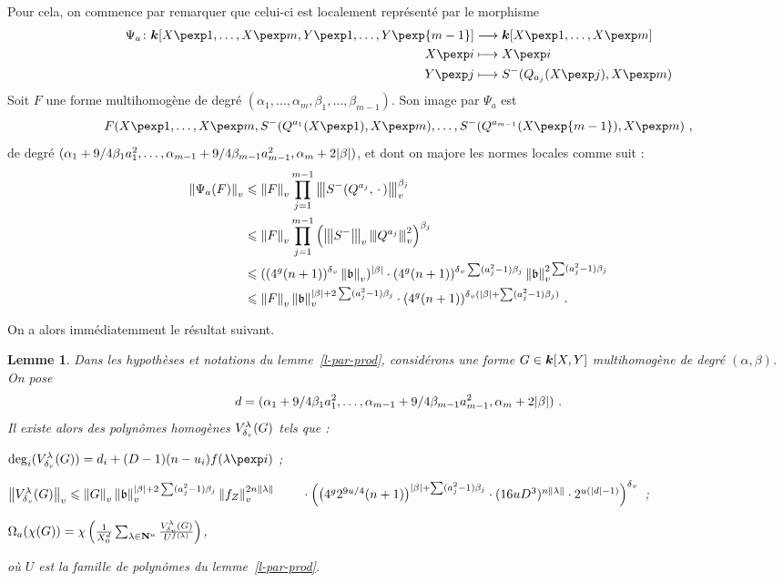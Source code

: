 \documentclass[11pt, twoside, a4paper]{article}
\newtheorem{lem}[thm]{Lemme} \newtheorem{coro}[thm]{Corollaire}
\theoremstyle{definition}
\begin{document}
Pour cela, on commence par remarquer que celui-ci est localement
représenté par le morphisme
 \begin{align*}
   \Psi_a \colon \cdn[X\pexp1, \ldots, X\pexp m, Y\pexp1, \ldots, Y\pexp{m-1}]
   & \longrightarrow \cdn[X\pexp1, \ldots, X\pexp m] \\
   X\pexp i & \longmapsto X\pexp i \\
   Y\pexp j & \longmapsto S^-(Q_{a_j}(X\pexp j), X\pexp m) \\
 \end{align*}
Soit $F$ une forme multihomogène de degré $(\alpha_1, \ldots, \alpha_m,
\beta_1, \ldots, \beta_{m-1})$. Son image par $\Psi_a$ est
\[
  F(X\pexp1, \ldots, X\pexp m, S^-(Q^{a_1}(X\pexp 1), X\pexp m), \ldots,
  S^-(Q^{a_{m-1}}(X\pexp{m-1}), X\pexp m) \pmm,
\]
de degré $(\alpha_1 + 9/4 \beta_1 a_1^2, \ldots, \alpha_{m-1} + 9/4
\beta_{m-1} a_{m-1}^2, \alpha_m +2{\lvert\beta\rvert})$, et dont on majore les normes
locales comme suit :
\begin{align*}
  \left\lVert\Psi_a(F)\right\rVert_{v}
  & \leqslant \left\lVert F\right\rVert_{v} \prod_{j=1}^{m-1} \left\lvert\hspace{-1pt}\left\lvert\hspace{-1pt} \left\lvert S^-(Q^{a_j}, {\,\cdot\,})\right\rvert \hspace{-1pt}\right\rvert\hspace{-1pt}\right\rvert_{v}^{\beta_j} \\
  & \leqslant \left\lVert F\right\rVert_{v} \prod_{j=1}^{m-1} \left( \left\lvert\hspace{-1pt}\left\lvert\hspace{-1pt} \left\lvert S^-\right\rvert \hspace{-1pt}\right\rvert\hspace{-1pt}\right\rvert_{v} \left\lvert\hspace{-1pt}\left\lvert\hspace{-1pt} \left\lvert Q^{a_j}\right\rvert \hspace{-1pt}\right\rvert\hspace{-1pt}\right\rvert_{v}^2
    \right)^{\beta_j} \\
  & \leqslant ((4^g(n+1))^{\delta\smash{_v}} \left\lVert\mathfrak b\right\rVert_{v})^{{\lvert\beta\rvert}} \cdot (4^g(n+1))^{{\delta\smash{_v}}\sum(a_j^2
      -1)\beta_j} \left\lVert\mathfrak b\right\rVert_{v}^{2\sum(a_j^2-1)\beta_j} \\
  & \leqslant \left\lVert F\right\rVert_{v} \left\lVert\mathfrak b\right\rVert_{v}^{{\lvert\beta\rvert} + 2\sum(a_j^2-1)\beta_j} \cdot
    (4^g(n+1))^{{\delta\smash{_v}}({\lvert\beta\rvert} + \sum(a_j^2-1)\beta_j)} \text{ .}
\end{align*}

On a alors immédiatemment le résultat suivant.

\begin{lem} \label{l-param-fin}
  Dans les hypothèses et notations du lemme~\ref{l-par-prod}, considérons une
  forme $G \in \boldsymbol{k}[X, Y]$ multihomogène de degré $(\alpha, \beta)$. On pose 
  \[ d = (\alpha_1 + 9/4 \beta_1 a_1^2, \ldots, 
  \alpha_{m-1} + 9/4 \beta_{m-1} a_{m-1}^2, \alpha_m +2{\lvert\beta\rvert}) \text{ .} \]
  Il existe alors des polynômes homogènes $V^\lambda_{\delta\smash{_v}}(G)$ tels que :
  \begin{enumthm}
    \item $\deg_i(V_\dv^\lambda(G)) = d_i + (D-1)(n-u_i)f(\lambda\pexp i)$ ;
    \item $\nv{V_\dv^\lambda(G)} \le \nv G \nv\BA ^{\lgr\beta + 2\sum
      (a_j^2-1)\beta_j} \nv{f_Z}^{2n\lgt\lambda} \\ \null\qquad \cdot
      \Big( \big(4^g 2^{9u/4}(n+1)\big)^{\lgr\beta + \sum(a_j^2-1)\beta_j}
      \cdot (16uD^3)^{n\lgt\lambda} \cdot 2^{u(\lgr d -1)}
      \Big)^\dv$ ;
    \item $\Omega_a(\chi(G)) =\chi \left( \frac1{X_0^d} \sum_{\lambda \in \mathbf{N}^u}
      \frac {V_{\delta\smash{_v}}^\lambda(G)} {U^{f(\lambda)}} \right)$,
  \end{enumthm}
  où $U$ est la famille de polynômes du lemme~\ref{l-par-prod}.
\end{lem}
\end{document}
